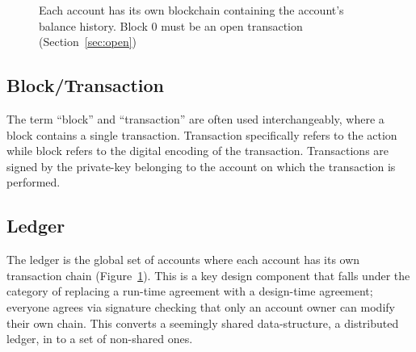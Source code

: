 \begin{figure}[!b]
      \caption{Each account has its own blockchain containing the account's balance history. Block 0 must be an open transaction (Section~\ref{sec:open})}
      \label{fig:account_chain}
\end{figure}

\subsection{Block/Transaction}
The term ``block'' and ``transaction'' are often used interchangeably, where a block contains a single transaction. Transaction specifically refers to the action while block refers to the digital encoding of the transaction. Transactions are signed by the private-key belonging to the account on which the transaction is performed.

\subsection{Ledger}
The ledger is the global set of accounts where each account has its own transaction chain (Figure~\ref{fig:account_chain}). This is a key design component that falls under the category of replacing a run-time agreement with a design-time agreement; everyone agrees via signature checking that only an account owner can modify their own chain. This converts a seemingly shared data-structure, a distributed ledger, in to a set of non-shared ones.

